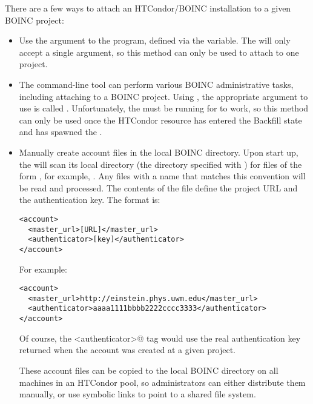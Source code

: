 There are a few ways to attach an HTCondor/BOINC installation to a given
BOINC project:
\begin{itemize}

\item Use the  argument to the 
  program, defined via the  variable.
  The  will only accept a single
   argument, so this method can only be used to
  attach to one project.

\item The  command-line tool can perform various
  BOINC administrative tasks, including attaching to a BOINC project.
  Using , the appropriate argument to use is called
  .
  Unfortunately, the  must be running for
   to work, so this method can only be used once the
  HTCondor resource has entered the Backfill state and has spawned the
  . 
  
\item Manually create account files in the local BOINC directory.
  Upon start up, the  will scan its local directory
  (the directory specified with )
  for files of the form , for example,
  . 
  Any files with a name that matches this convention will be read and
  processed.
  The contents of the file define the project URL and the
  authentication key.
  The format is:

\footnotesize
\begin{verbatim}
<account>
  <master_url>[URL]</master_url>
  <authenticator>[key]</authenticator>
</account>
\end{verbatim}
\normalsize

For example: 

\footnotesize
\begin{verbatim}
<account>
  <master_url>http://einstein.phys.uwm.edu</master_url>
  <authenticator>aaaa1111bbbb2222cccc3333</authenticator>
</account>
\end{verbatim}
\normalsize

Of course, the \verb@<authenticator>@ tag would use the real
authentication key returned when the account was created at a given
project.

These account files can be copied to the local BOINC directory on all
machines in an HTCondor pool, so administrators can either distribute
them manually, or use symbolic links to point to a shared file
system. 

\end{itemize}

